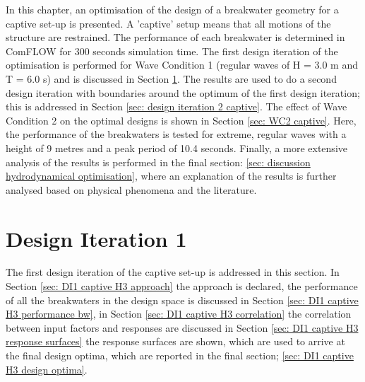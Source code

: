 In this chapter, an optimisation of the design of a breakwater geometry for a captive set-up is presented. A 'captive' setup means that all motions of the structure are restrained. The performance of each breakwater is determined in ComFLOW for 300 seconds simulation time. The first design iteration of the optimisation is performed for Wave Condition 1 (regular waves of H = 3.0 m and T = 6.0 s) and is discussed in Section \ref{sec: design iteration 1 captive}. The results are used to do a second design iteration with boundaries around the optimum of the first design iteration; this is addressed in Section \ref{sec: design iteration 2 captive}. The effect of Wave Condition 2 on the optimal designs is shown in Section \ref{sec: WC2 captive}. Here, the performance of the breakwaters is tested for extreme, regular waves with a height of 9 metres and a peak period of 10.4 seconds. Finally, a more extensive analysis of the results is performed in the final section: \ref{sec: discussion hydrodynamical optimisation}, where an explanation of the results is further analysed based on physical phenomena and the literature. 






\section{Design Iteration 1}
\label{sec: design iteration 1 captive}

The first design iteration of the captive set-up is addressed in this section. In Section \ref{sec: DI1 captive H3 approach} the approach is declared, the performance of all the breakwaters in the design space is discussed in Section \ref{sec: DI1 captive H3 performance bw}, in Section \ref{sec: DI1 captive H3 correlation} the correlation between input factors and responses are discussed in Section \ref{sec: DI1 captive H3 response surfaces} the response surfaces are shown, which are used to arrive at the final design optima, which are reported in the final section; \ref{sec: DI1 captive H3 design optima}.


